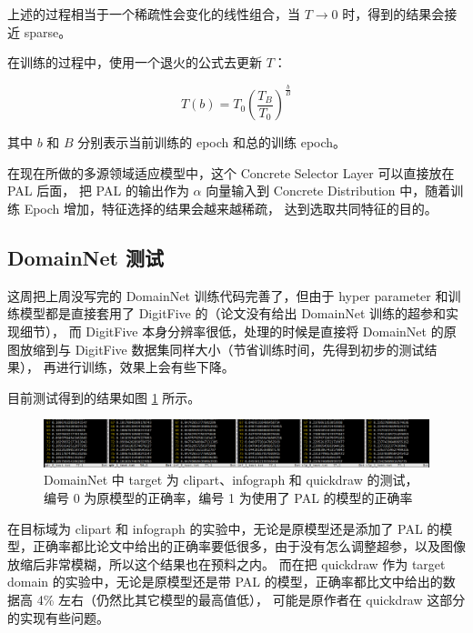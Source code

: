 \documentclass[UTF8]{ctexart}
\begin{document}
                上述的过程相当于一个稀疏性会变化的线性组合，当 $T \rightarrow 0$ 时，得到的结果会接近 sparse。

                在训练的过程中，使用一个退火的公式去更新 $T$：

                $$
                    T(b) = T_0(\frac{T_B}{T_0})^{\frac{b}{B}}
                $$

                其中 $b$ 和 $B$ 分别表示当前训练的 epoch 和总的训练 epoch。

                在现在所做的多源领域适应模型中，这个 Concrete Selector Layer 可以直接放在 PAL 后面，
                把 PAL 的输出作为 $\alpha$ 向量输入到 Concrete Distribution 中，随着训练 Epoch 增加，特征选择的结果会越来越稀疏，
                达到选取共同特征的目的。
            \subsection{DomainNet 测试}
                这周把上周没写完的 DomainNet 训练代码完善了，但由于 hyper parameter 和训练模型都是直接套用了 DigitFive 的（论文没有给出 DomainNet 训练的超参和实现细节），
                而 DigitFive 本身分辨率很低，处理的时候是直接将 DomainNet 的原图放缩到与 DigitFive 数据集同样大小（节省训练时间，先得到初步的测试结果），
                再进行训练，效果上会有些下降。

                目前测试得到的结果如图 \ref{fig:test} 所示。

                \begin{figure}[ht]
                    \centering
                    \includegraphics[scale=0.26]{Week08_DomainNet_test.png}
                    \caption{DomainNet 中 target 为 clipart、infograph 和 quickdraw 的测试，编号 0 为原模型的正确率，编号 1 为使用了 PAL 的模型的正确率}
                    \label{fig:test}
                \end{figure}

                在目标域为 clipart 和 infograph 的实验中，无论是原模型还是添加了 PAL 的模型，正确率都比论文中给出的正确率要低很多，由于没有怎么调整超参，以及图像放缩后非常模糊，所以这个结果也在预料之内。
                而在把 quickdraw 作为 target domain 的实验中，无论是原模型还是带 PAL 的模型，正确率都比文中给出的数据高 4\% 左右（仍然比其它模型的最高值低），
                可能是原作者在 quickdraw 这部分的实现有些问题。
\end{document}
